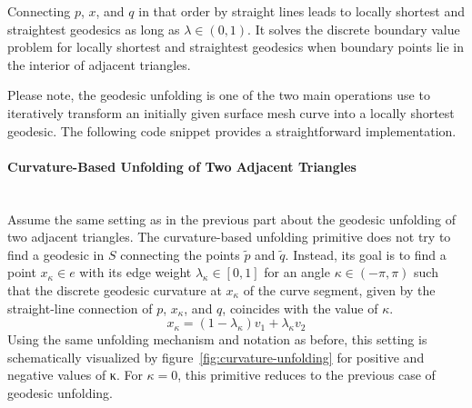 \documentclass{stdlocal}
\begin{document}
  \begin{lemma}
    Connecting $p$, $x$, and $q$ in that order by straight lines leads to locally shortest and straightest geodesics as long as $λ\in (0,1)$.
    It solves the discrete boundary value problem for locally shortest and straightest geodesics when boundary points lie in the interior of adjacent triangles.
  \end{lemma}
  \noindent
  Please note, the geodesic unfolding is one of the two main operations \textcite{martinez2005} use to iteratively transform an initially given surface mesh curve into a locally shortest geodesic.
  The following code snippet provides a straightforward implementation.



  \paragraph{Curvature-Based Unfolding of Two Adjacent Triangles}\hfill\\
    Assume the same setting as in the previous part about the geodesic unfolding of two adjacent triangles.
    The curvature-based unfolding primitive does not try to find a geodesic in $S$ connecting the points $\tilde{p}$ and $\tilde{q}$.
    Instead, its goal is to find a point $x_κ \in e$ with its edge weight $λ_κ\in[0,1]$ for an angle $κ\in(-π,π)$ such that the discrete geodesic curvature at $x_κ$ of the curve segment, given by the straight-line connection of $p$, $x_κ$, and $q$, coincides with the value of $κ$.
    \[
      x_κ = (1-λ_κ)v_1 + λ_κ v_2
    \]
    Using the same unfolding mechanism and notation as before, this setting is schematically visualized by figure~\ref{fig:curvature-unfolding} for positive and negative values of κ.
    For $κ=0$, this primitive reduces to the previous case of geodesic unfolding.
\end{document}
